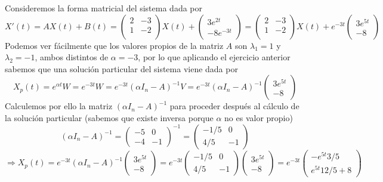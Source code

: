 \documentclass[fleqn]{article}
\begin{document}
    Consideremos la forma matricial del sistema dada por
    $$
    X'(t) = AX(t) + B(t) = 
    \begin{pmatrix}
        2 & -3 \\
        1 & -2 \\
    \end{pmatrix}
    X(t) + 
    \begin{pmatrix}
        3e^{2t} \\
        -8e^{-3t}
    \end{pmatrix}
    =
    \begin{pmatrix}
        2 & -3 \\
        1 & -2 \\
    \end{pmatrix}
    X(t) + e^{-3t}
    \begin{pmatrix}
        3e^{5t} \\
        -8
    \end{pmatrix}
    $$
    Podemos ver fácilmente que los valores propios de la matriz $A$ son $\lambda_1=1$ y $\lambda_2=-1$, ambos distintos de $\alpha = -3$, por lo que aplicando el ejercicio anterior sabemos 
    que una solución particular del sistema viene dada por 
    $$X_p(t) = e^{\alpha t}W =  e^{-3t}W  = e^{-3t}(\alpha I_n -A)^{-1} V = e^{-3t}(\alpha I_n -A)^{-1} \begin{pmatrix} 3e^{5t} \\ -8 \end{pmatrix}$$
    Calculemos por ello la matriz $(\alpha I_n -A)^{-1}$ para proceder después al cálculo de la solución particular (sabemos que existe inversa porque $\alpha$ no es valor propio)
    $$
    (\alpha I_n -A)^{-1} = 
    \begin{pmatrix}
        -5 & 0\\
        -4 & -1
    \end{pmatrix}^{-1}=
    \begin{pmatrix}
        -1/5 & 0\\
        4/5 & -1
    \end{pmatrix}
    $$
    $$
    \Rightarrow X_p(t) = 
    e^{-3t}(\alpha I_n -A)^{-1} 
    \begin{pmatrix} 
    3e^{5t} \\ 
    -8 
    \end{pmatrix} = 
    e^{-3t}
    \begin{pmatrix}
        -1/5 & 0\\
        4/5 & -1   
    \end{pmatrix}
    \begin{pmatrix} 
        3e^{5t} \\ 
        -8 
    \end{pmatrix} = 
    e^{-3t}
    \begin{pmatrix}
        -e^{5t}3/5 \\
        e^{5t}12/5+8
    \end{pmatrix}
    $$
\end{document}
